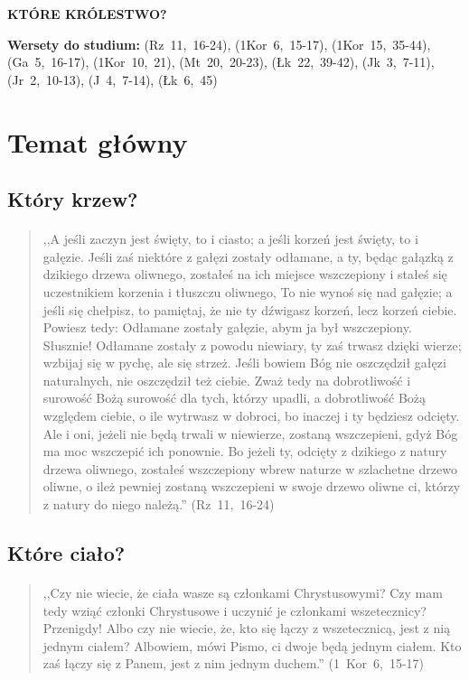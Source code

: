 \documentclass[10pt,a4paper,oneside]{article}
\begin{document}
\centerline{\textbf{\MakeUppercase{Które królestwo?}}}
\begin{center}
\textbf{Wersety do studium:} \mbox{(Rz 11, 16-24)}, \mbox{(1Kor 6, 15-17)}, \mbox{(1Kor 15, 35-44)}, \mbox{(Ga 5, 16-17)}, \mbox{(1Kor 10, 21)}, \mbox{(Mt 20, 20-23)}, \mbox{(Łk 22, 39-42)}, \mbox{(Jk 3, 7-11)}, \mbox{(Jr 2, 10-13)}, \mbox{(J 4, 7-14)}, \mbox{(Łk 6, 45)}
\end{center}
\section{Temat główny}
\subsection{Który krzew?}
\paragraph{}
\begin{quote}
,,A jeśli zaczyn jest święty, to i ciasto; a jeśli korzeń jest święty, to i gałęzie. Jeśli zaś niektóre z gałęzi zostały odłamane, a ty, będąc gałązką z dzikiego drzewa oliwnego, zostałeś na ich miejsce wszczepiony i stałeś się uczestnikiem korzenia i tłuszczu oliwnego, To nie wynoś się nad gałęzie; a jeśli się chełpisz, to pamiętaj, że nie ty dźwigasz korzeń, lecz korzeń ciebie. Powiesz tedy: Odłamane zostały gałęzie, abym ja był wszczepiony. Słusznie! Odłamane zostały z powodu niewiary, ty zaś trwasz dzięki wierze; wzbijaj się w pychę, ale się strzeż. Jeśli bowiem Bóg nie oszczędził gałęzi naturalnych, nie oszczędził też ciebie. Zważ tedy na dobrotliwość i surowość Bożą surowość dla tych, którzy upadli, a dobrotliwość Bożą względem ciebie, o ile wytrwasz w dobroci, bo inaczej i ty będziesz odcięty. Ale i oni, jeżeli nie będą trwali w niewierze, zostaną wszczepieni, gdyż Bóg ma moc wszczepić ich ponownie. Bo jeżeli ty, odcięty z dzikiego z natury drzewa oliwnego, zostałeś wszczepiony wbrew naturze w szlachetne drzewo oliwne, o ileż pewniej zostaną wszczepieni w swoje drzewo oliwne ci, którzy z natury do niego należą.'' \mbox{(Rz 11, 16-24)}
\end{quote}
\subsection{Które ciało?}
\paragraph{}
\begin{quote}
,,Czy nie wiecie, że ciała wasze są członkami Chrystusowymi? Czy mam tedy wziąć członki Chrystusowe i uczynić je członkami wszetecznicy? Przenigdy! Albo czy nie wiecie, że, kto się łączy z wszetecznicą, jest z nią jednym ciałem? Albowiem, mówi Pismo, ci dwoje będą jednym ciałem. Kto zaś łączy się z Panem, jest z nim jednym duchem.'' \mbox{(1 Kor 6, 15-17)}
\end{quote}
\end{document}
